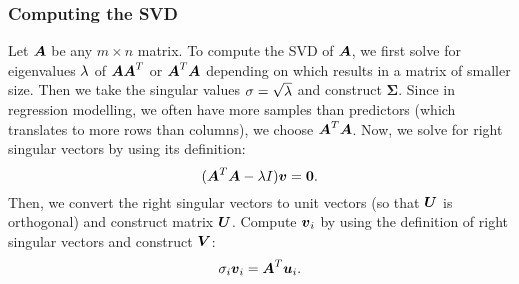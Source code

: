 \documentclass[12pt]{article}
\newcommand{\Sg}{\Sigma}
\begin{document}
	\subsubsection{Computing the SVD}
	Let $\boldsymbol{A}$ be any $m\times n$ matrix. To compute the SVD of $\boldsymbol{A}$, we first solve for eigenvalues $\lambda$ of $\boldsymbol{A}\boldsymbol{A}^T$ or $\boldsymbol{A}^T\boldsymbol{A}$ depending on which results in a matrix of smaller size. Then we take the singular values $\sigma=\sqrt{\lambda}$ and construct $\boldsymbol{\Sg}$. Since in regression modelling, we often have more samples than predictors (which translates to more rows than columns), we choose $\boldsymbol{A}^T\boldsymbol{A}$. Now, we solve for right singular vectors by using its definition:
	$$(\boldsymbol{A}^T\boldsymbol{A}-\lambda I)\boldsymbol{v}=\textbf{0}.$$
	Then, we convert the right singular vectors to unit vectors (so that $\boldsymbol{U}$ is orthogonal) and construct matrix $\boldsymbol{U}$. Compute $\boldsymbol{v}_i$ by using the definition of right singular vectors and construct $\boldsymbol{V}$:
	$$\sigma_i\boldsymbol{v}_i=\boldsymbol{A}^T\boldsymbol{u}_i.$$
\end{document}
